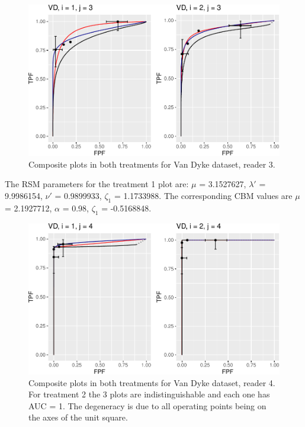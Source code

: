 \documentclass[
]{book}
\begin{document}
\begin{figure}
\centering
\includegraphics{19b-rsm-3-fits_files/figure-latex/rsm-3-fits-plots-1-3-1.pdf}
\caption{\label{fig:rsm-3-fits-plots-1-3}Composite plots in both treatments for Van Dyke dataset, reader 3.}
\end{figure}

The RSM parameters for the treatment 1 plot are: \(\mu\) = 3.1527627, \(\lambda'\) = 9.9986154, \(\nu'\) = 0.9899933, \(\zeta_1\) = 1.1733988. The corresponding CBM values are \(\mu\) = 2.1927712, \(\alpha\) = 0.98, \(\zeta_1\) = -0.5168848.

\begin{figure}
\centering
\includegraphics{19b-rsm-3-fits_files/figure-latex/rsm-3-fits-plots-1-4-1.pdf}
\caption{\label{fig:rsm-3-fits-plots-1-4}Composite plots in both treatments for Van Dyke dataset, reader 4. For treatment 2 the 3 plots are indistinguishable and each one has AUC = 1. The degeneracy is due to all operating points being on the axes of the unit square.}
\end{figure}
\end{document}
